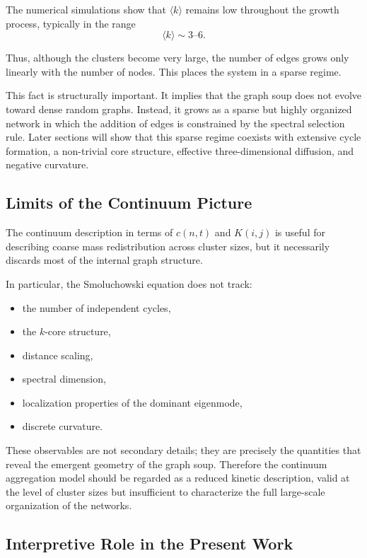 \documentclass[11pt]{article}
\begin{document}
The numerical simulations show that $\langle k\rangle$ remains low throughout the growth process, typically in the range
\[
\langle k\rangle \sim 3\text{--}6.
\]

Thus, although the clusters become very large, the number of edges grows only linearly with the number of nodes.
This places the system in a sparse regime.

This fact is structurally important.
It implies that the graph soup does not evolve toward dense random graphs.
Instead, it grows as a sparse but highly organized network in which the addition of edges is constrained by the spectral selection rule.
Later sections will show that this sparse regime coexists with extensive cycle formation, a non-trivial core structure, effective three-dimensional diffusion, and negative curvature.

\subsection{Limits of the Continuum Picture}

The continuum description in terms of $c(n,t)$ and $K(i,j)$ is useful for describing coarse mass redistribution across cluster sizes, but it necessarily discards most of the internal graph structure.

In particular, the Smoluchowski equation does not track:

\begin{itemize}
\item the number of independent cycles,
\item the $k$-core structure,
\item distance scaling,
\item spectral dimension,
\item localization properties of the dominant eigenmode,
\item discrete curvature.
\end{itemize}

These observables are not secondary details; they are precisely the quantities that reveal the emergent geometry of the graph soup.
Therefore the continuum aggregation model should be regarded as a reduced kinetic description, valid at the level of cluster sizes but insufficient to characterize the full large-scale organization of the networks.

\subsection{Interpretive Role in the Present Work}
\end{document}
